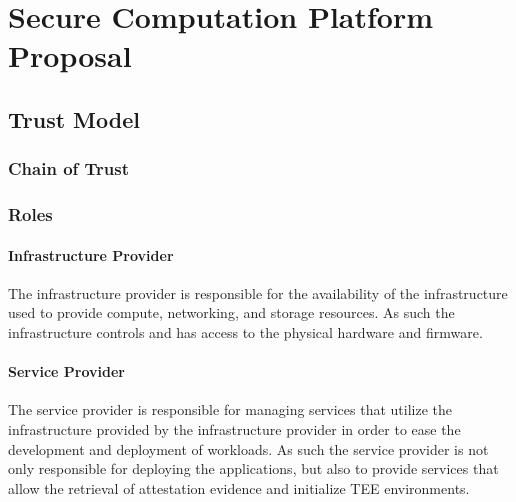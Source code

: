 
\chapter{Secure Computation Platform Proposal}
\label{ch:proposal}

\section{Trust Model}
\label{sec:trust-model}


\subsection{Chain of Trust}


\subsection{Roles}

\subsubsection*{Infrastructure Provider}

The infrastructure provider is responsible for the availability of the
infrastructure used to provide compute, networking, and storage resources. As
such the infrastructure controls and has access to the physical hardware and
firmware.

\subsubsection*{Service Provider}

The service provider is responsible for managing services that utilize the
infrastructure provided by the infrastructure provider in order to ease the
development and deployment of workloads. As such the service provider is not
only responsible for deploying the applications, but also to provide services
that allow the retrieval of attestation evidence and initialize TEE
environments.

